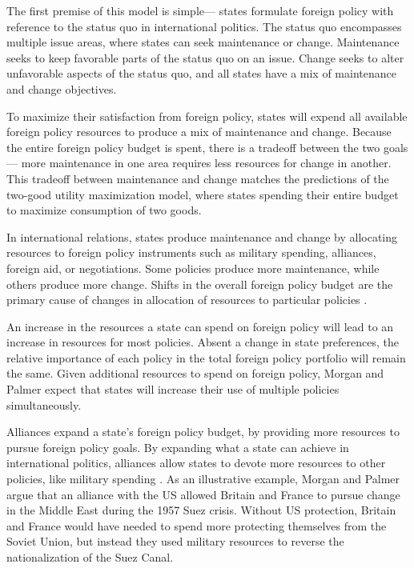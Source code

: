 \documentclass[12pt]{article}
\begin{document}
The first premise of this model is simple--- states formulate foreign policy with reference to the status quo in international politics. 
The status quo encompasses multiple issue areas, where states can seek maintenance or change. 
Maintenance seeks to keep favorable parts of the status quo on an issue.
Change seeks to alter unfavorable aspects of the status quo, and all states have a mix of maintenance and change objectives. 


To maximize their satisfaction from foreign policy, states will expend all available foreign policy resources to produce a mix of maintenance and change. 
Because the entire foreign policy budget is spent, there is a tradeoff between the two goals--- more maintenance in one area requires less resources for change in another. 
This tradeoff between maintenance and change matches the predictions of the two-good utility maximization model, where states spending their entire budget to maximize consumption of two goods.


In international relations, states produce maintenance and change by allocating resources to foreign policy instruments such as military spending, alliances, foreign aid, or negotiations. 
Some policies produce more maintenance, while others produce more change. 
Shifts in the overall foreign policy budget are the primary cause of changes in allocation of resources to particular policies \citep{MorganPalmer2000}.


An increase in the resources a state can spend on foreign policy will lead to an increase in resources for most policies.
Absent a change in state preferences, the relative importance of each policy in the total foreign policy portfolio will remain the same. 
Given additional resources to spend on foreign policy, Morgan and Palmer expect that states will increase their use of multiple policies simultaneously. 


Alliances expand a state's foreign policy budget, by providing more resources to pursue foreign policy goals.
By expanding what a state can achieve in international politics, alliances allow states to devote more resources to other policies, like military spending \citep{MorganPalmer2003}. 
As an illustrative example, Morgan and Palmer argue that an alliance with the US allowed Britain and France to pursue change in the Middle East during the 1957 Suez crisis.
Without US protection, Britain and France would have needed to spend more protecting themselves from the Soviet Union, but instead they used military resources to reverse the nationalization of the Suez Canal.
\end{document}
